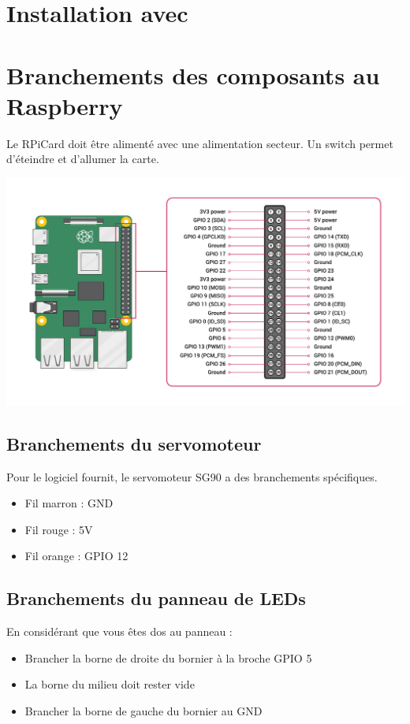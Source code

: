 \section{Installation avec }


\newpage
\section{Branchements des composants au Raspberry}
Le \gls{RPiCard} doit être alimenté avec une alimentation secteur. Un switch permet d'éteindre et d'allumer la carte.

\includegraphics[width=\textwidth]{img/Rpi4_pin.png}

\subsection{Branchements du servomoteur}

Pour le logiciel fournit, le servomoteur \gls{SG90} a des branchements spécifiques.
\begin{itemize}
    \item Fil marron : GND
    \item Fil rouge  : 5V
    \item Fil orange : GPIO 12
\end{itemize}

\subsection{Branchements du panneau de LEDs}

En considérant que vous êtes dos au panneau :
\begin{itemize}
    \item Brancher la borne de droite du bornier à la broche GPIO 5
    \item La borne du milieu doit rester vide
    \item Brancher la borne de gauche du bornier au GND
\end{itemize}


